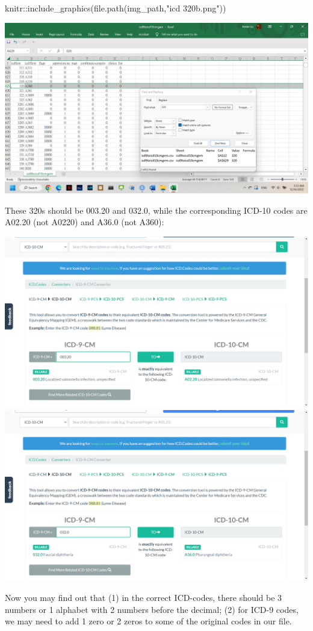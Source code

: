 \documentclass[
]{article}
\newenvironment{Shaded}{\begin{snugshade}}{\end{snugshade}}
\newcommand{\FunctionTok}[1]{\textcolor[rgb]{0.00,0.00,0.00}{#1}}
\newcommand{\NormalTok}[1]{#1}
\newcommand{\SpecialCharTok}[1]{\textcolor[rgb]{0.00,0.00,0.00}{#1}}
\newcommand{\StringTok}[1]{\textcolor[rgb]{0.31,0.60,0.02}{#1}}
\begin{document}
\begin{Shaded}
\begin{Highlighting}[]
\NormalTok{knitr}\SpecialCharTok{::}\FunctionTok{include\_graphics}\NormalTok{(}\FunctionTok{file.path}\NormalTok{(img\_path,}\StringTok{"icd 320b.png"}\NormalTok{))}
\end{Highlighting}
\end{Shaded}

\includegraphics[width=26.67in]{img/icd 320b}

These 320s should be 003.20 and 032.0, while the corresponding ICD-10
codes are A02.20 (not A0220) and A36.0 (not A360):

\includegraphics[width=0.5\linewidth]{img/icd 320 1}
\includegraphics[width=0.5\linewidth]{img/icd 320 2}

Now you may find out that (1) in the correct ICD-codes, there should be
3 numbers or 1 alphabet with 2 numbers before the decimal; (2) for ICD-9
codes, we may need to add 1 zero or 2 zeros to some of the original
codes in our file.
\end{document}
